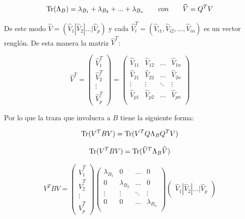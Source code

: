 \begin{equation*}
\operatorname{Tr}(\Lambda_{B}) = \lambda_{B_1}+ \lambda_{B_2}+ ... +\lambda_{B_n} \qquad con \qquad \widehat{V} = Q^T V
\end{equation*}



De este modo $\widehat{V} = (\widehat{V}_1 | \widehat{V}_2 | ... | \widehat{V}_p)$ y cada $\widehat{V}_i^T = (\widehat{V}_{i1}, \widehat{V}_{i2}, ..., \widehat{V}_{in})$ es un vector renglón. De esta manera la matriz $\widehat{V}^T$:

\begin{equation*}
\widehat{V}^T = 	
\left(\!
    \begin{array}{c}
      \widehat{V}_1^T\\
      \widehat{V}_2^T\\
      \vdots \\
      \widehat{V}_p^T
    \end{array}
  \!\right)   = 
\left(\!
    \begin{array}{cccc}
      \widehat{V}_{11} & \widehat{V}_{12} & \hdots & \widehat{V}_{1n}\\
      \widehat{V}_{21} & \widehat{V}_{22} & \hdots & \widehat{V}_{2n}\\
      \vdots &  \vdots &\ddots & \vdots\\
      \widehat{V}_{p1} & \widehat{V}_{p2} & \hdots & \widehat{V}_{pn}\\
    \end{array}
  \!\right) 
\end{equation*}

Por lo que la traza que involucra a $B$ tiene la siguiente forma:

\begin{equation*}
\operatorname{Tr}(V^T B V) = \operatorname{Tr}(V^T Q \Lambda_{B} Q^T V) 	
\end{equation*}

\begin{equation*}
\operatorname{Tr}(V^T B V)  = \operatorname{Tr}(\widehat{V}^T \Lambda_{B} \widehat{V})
\end{equation*}

\begin{equation*}
V^T B V = 
\left(\!
    \begin{array}{c}
      \widehat{V}_1^T\\
      \widehat{V}_2^T\\
      \vdots \\
      \widehat{V}_p^T
    \end{array}
  \!\right) 
  \left(\!
    \begin{array}{cccc}
      \lambda_{B_1} & 0 & \hdots & 0\\
      0 & \lambda_{B_2} & \hdots & 0\\
      \vdots &  \vdots &\ddots & \vdots\\
      0 & 0 & \hdots & \lambda_{B_n}\\
    \end{array}
  \!\right) 
  \left(\!\begin{array}{c}
      \widehat{V}_1 |
      \widehat{V}_2 |
      \hdots |
      \widehat{V}_p
    \end{array}
  \!\right) 
\end{equation*} 

